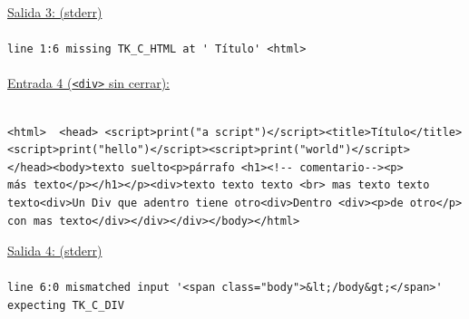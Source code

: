 \underline{Salida 3: (stderr)} 
\\\\
\verb|line 1:6 missing TK_C_HTML at ' Título' <html>|\\\\
\underline{Entrada 4 (\texttt{<div>} sin cerrar):}
\\\\
\begin{verbatim}
<html>  <head> <script>print("a script")</script><title>Título</title>
<script>print("hello")</script><script>print("world")</script>
</head><body>texto suelto<p>párrafo <h1><!-- comentario--><p> 
más texto</p></h1></p><div>texto texto texto <br> mas texto texto 
texto<div>Un Div que adentro tiene otro<div>Dentro <div><p>de otro</p> 
con mas texto</div></div></div></body></html>
\end{verbatim}

\underline{Salida 4: (stderr)}  \\\\
{\footnotesize
\verb|line 6:0 mismatched input '<span class="body">&lt;/body&gt;</span>' expecting TK_C_DIV|
}
